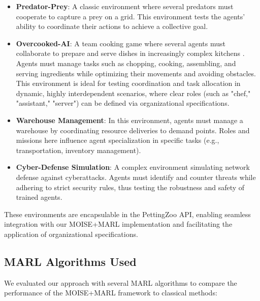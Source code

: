 \documentclass[sigconf,anonymous]{aamas}
\begin{document}
\begin{itemize}
    \item \textbf{Predator-Prey}: A classic environment where several predators must cooperate to capture a prey on a grid. This environment tests the agents' ability to coordinate their actions to achieve a collective goal.

    \item \textbf{Overcooked-AI}: A team cooking game where several agents must collaborate to prepare and serve dishes in increasingly complex kitchens \cite{overcookedai}. Agents must manage tasks such as chopping, cooking, assembling, and serving ingredients while optimizing their movements and avoiding obstacles. This environment is ideal for testing coordination and task allocation in dynamic, highly interdependent scenarios, where clear roles (such as "chef," "assistant," "server") can be defined via organizational specifications.
    
    
    \item \textbf{Warehouse Management}: In this environment, agents must manage a warehouse by coordinating resource deliveries to demand points. Roles and missions here influence agent specialization in specific tasks (e.g., transportation, inventory management).
    
    \item \textbf{Cyber-Defense Simulation}: A complex environment simulating network defense against cyberattacks. Agents must identify and counter threats while adhering to strict security rules, thus testing the robustness and safety of trained agents.
\end{itemize}

These environments are encapsulable in the PettingZoo API, enabling seamless integration with our MOISE+MARL implementation and facilitating the application of organizational specifications.

\subsection{MARL Algorithms Used}

We evaluated our approach with several MARL algorithms to compare the performance of the MOISE+MARL framework to classical methods:
\end{document}
